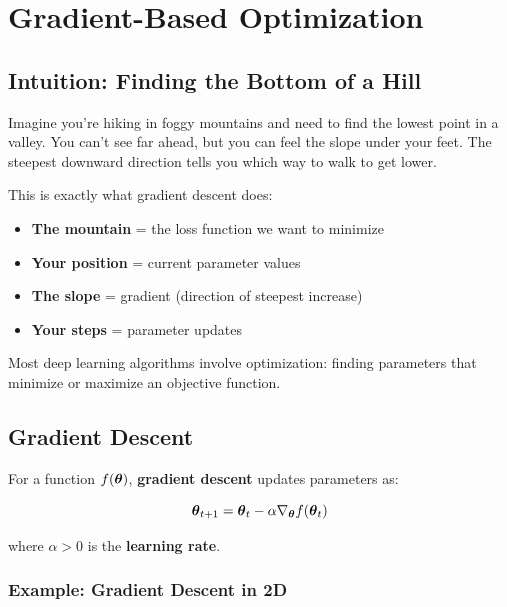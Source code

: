 
\section{Gradient-Based Optimization}
\label{sec:gradient-optimization}

\subsection{Intuition: Finding the Bottom of a Hill}

Imagine you're hiking in foggy mountains and need to find the lowest point in a valley. You can't see far ahead, but you can feel the slope under your feet. The steepest downward direction tells you which way to walk to get lower.

This is exactly what gradient descent does:
\begin{itemize}
    \item \textbf{The mountain} = the loss function we want to minimize
    \item \textbf{Your position} = current parameter values
    \item \textbf{The slope} = gradient (direction of steepest increase)
    \item \textbf{Your steps} = parameter updates
\end{itemize}

Most deep learning algorithms involve optimization: finding parameters that minimize or maximize an objective function.

\subsection{Gradient Descent}

For a function $f(\boldsymbol{\theta})$, \textbf{gradient descent} updates parameters as:

\begin{equation}
\boldsymbol{\theta}_{t+1} = \boldsymbol{\theta}_t - \alpha \nabla_{\boldsymbol{\theta}} f(\boldsymbol{\theta}_t)
\end{equation}

where $\alpha > 0$ is the \textbf{learning rate}.

\subsubsection{Example: Gradient Descent in 2D}

